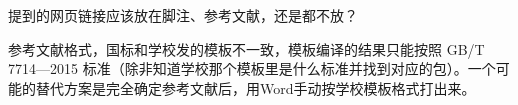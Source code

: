 

\begin{appendix}

    \begingroup
    \renewcommand{\clearpage}{\relax}
    \listoftodos
    提到的网页链接应该放在脚注、参考文献，还是都不放？

    参考文献格式，国标和学校发的模板不一致，模板编译的结果只能按照 GB/T 7714—2015 标准（除非知道学校那个模板里是什么标准并找到对应的包）。一个可能的替代方案是完全确定参考文献后，用Word手动按学校模板格式打出来。
    \endgroup

    \listoffigures
    \listoffigureEng

\end{appendix}

